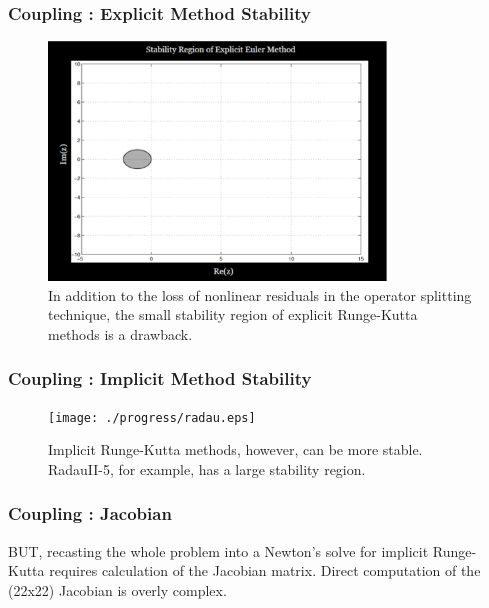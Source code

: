 
\begin{frame}[fragile]
  \frametitle{Coupling : Explicit Method Stability}
  \begin{figure}[htbp!]
    \begin{center}
      \includegraphics[width=0.8\textwidth]{./progress/euler.eps}
    \end{center}
    \caption{In addition to the loss of nonlinear residuals in the operator 
    splitting technique, the small stability region of explicit Runge-Kutta methods is 
  a drawback.}
    \label{fig:euler_stability}
  \end{figure}

\end{frame}

\begin{frame}[fragile]
  \frametitle{Coupling : Implicit Method Stability}
  \begin{figure}[htbp!]
    \begin{center}
      \texttt{[image: ./progress/radau.eps]}
    \end{center}
    \caption{Implicit Runge-Kutta methods, however, can be more stable. RadauII-5, for example, has a large stability region.}
    \label{fig:radau_stability}
  \end{figure}

\end{frame}


\begin{frame}[fragile]
  \frametitle{Coupling : Jacobian}
BUT, recasting the whole problem into a Newton's solve for implicit Runge-Kutta
requires calculation of the Jacobian matrix. Direct computation of the (22x22)
Jacobian is overly complex. 
\end{frame}

